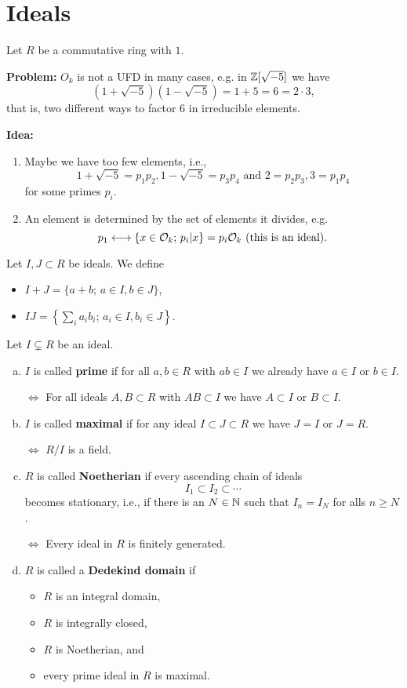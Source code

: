 \section{Ideals}
Let $R$ be a commutative ring with $1$.

\textbf{Problem:}
	$O_k$ is not a UFD in many cases, e.g. in $\mathbb{Z}[\sqrt{-5}]$ we have
	\[ (1+\sqrt{-5})(1-\sqrt{-5}) = 1+5=6=2\cdot 3,
	\]
	that is, two different ways to factor $6$ in irreducible elements.


\bigskip \textbf{Idea:}
\begin{enumerate}[(1)]
	\item Maybe we have too few elements, i.e.,
	\[ 1+\sqrt{-5} = p_1 p_2, 1-\sqrt{-5} = p_3 p_4 \text{ and }
		2=p_2p_3, 3=p_1 p_4
	\]
	for some primes $p_i$.
	\item An element is determined by the set of elements it divides, e.g.
	\[ p_1 \longleftrightarrow \{ x \in \mathcal{O}_k; \, p_i | x  \} = p_i \mathcal{O}_k \text{ (this is an ideal)}.
	\]
\end{enumerate}


\begin{Not}
	Let $I , J \subset R$ be ideals. We define
	\begin{itemize}
		\item $I+J = \{a+b; \, a \in I, b \in J  \}$,
		\item $IJ = \left\{ \sum_i a_i b_i; \, a_i \in I, b_i \in J \right\}$.
	\end{itemize}
\end{Not}

\begin{defi}
	Let $I \subsetneq R$ be an ideal.
	\begin{enumerate}[(a)]
		\item $I$ is called \textbf{prime} if for all $a,b \in R$ with $ab \in I$ we already have $a \in I$ or $b \in I$.
		
		$\Leftrightarrow$ For all ideals $A,B \subset R$ with $AB \subset I$ we have $A\subset I$ or $B \subset I$.
		\item $I$ is called \textbf{maximal} if for any ideal $I \subset J \subset R$ we have $J=I$ or $J=R$.
		
		$\Leftrightarrow$ $R/I$ is a field.
		\item $R$ is called \textbf{Noetherian} if every ascending chain of ideals
		\[ I_1 \subset I_2 \subset \cdots
		\]
		becomes stationary, i.e., if there is an $N \in \mathbb{N}$ such that $I_n = I_N$ for alls $n \geq N$.
		
		$\Leftrightarrow$ Every ideal in $R$ is finitely generated.
		\item $R$ is called a \textbf{Dedekind domain} if
		\begin{itemize}
			\item $R$ is an integral domain,
			\item $R$ is integrally closed,
			\item $R$ is Noetherian, and
			\item every prime ideal in $R$ is maximal.
		\end{itemize}
	\end{enumerate}
\end{defi}


